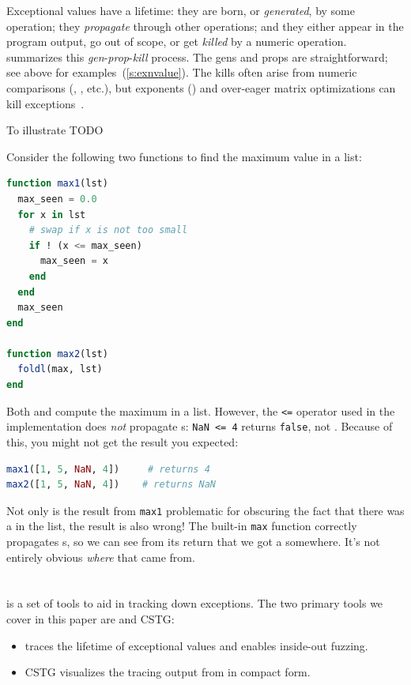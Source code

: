 \documentclass{juliacon}
\begin{document}
Exceptional values have a lifetime: they are born, or \emph{generated}, by some operation; they \emph{propagate} through other operations; and they either appear in the program output, go out of scope, or get \emph{killed} by a numeric operation.
 summarizes this \emph{gen}-\emph{prop}-\emph{kill} process.
The gens and props are straightforward; see above for examples~(\cref{s:exnvalue}).
The kills often arise from numeric comparisons (\code{<}, \code{=}, etc.),
but exponents () and over-eager matrix optimizations can kill
exceptions~\cite{ddghlllprr-correctness-2022}.

To illustrate TODO

Consider the following two functions to find the maximum value in a list:

\begin{lstlisting}[language = Julia]
function max1(lst)
  max_seen = 0.0
  for x in lst
    # swap if x is not too small
    if ! (x <= max_seen)
      max_seen = x
    end
  end
  max_seen
end

function max2(lst)
  foldl(max, lst)
end
\end{lstlisting}

Both  and  compute the maximum in a list.
However, the \texttt{<=} operator used in the  implementation does \emph{not} propagate \NaN{}s: \texttt{NaN <= 4} returns \texttt{false}, not \NaN{}.
Because of this, you might not get the result you expected:

\begin{lstlisting}[language = Julia]
max1([1, 5, NaN, 4])     # returns 4
max2([1, 5, NaN, 4])    # returns NaN
\end{lstlisting}

Not only is the result from \texttt{max1} problematic for obscuring the fact that there was a \NaN{} in the list, the result is also wrong!
The built-in \texttt{max} function correctly propagates \NaN{}s, so we can see from its return that we got a \NaN{} somewhere.
It's not entirely obvious \emph{where} that \NaN{} came from.

\section{\FlowFPX{}}
\label{s:flowfpx}

\FlowFPX{} is a set of tools to aid in tracking down \fp{} exceptions.
The two primary tools we cover in this paper are \FT{} and CSTG:

\begin{itemize}
\item \FT{} traces the lifetime of exceptional \fp{} values and enables inside-out fuzzing.
\item CSTG visualizes the tracing output from \FT{} in compact form.
\end{itemize}
\end{document}
